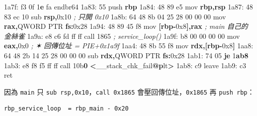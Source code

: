 \documentclass[10pt,a4paper]{article}
\newenvironment{Shaded}{\begin{snugshade}}{\end{snugshade}}
\newcommand{\BaseNTok}[1]{\textcolor[rgb]{0.00,0.00,0.81}{#1}}
\newcommand{\BuiltInTok}[1]{#1}
\newcommand{\CommentTok}[1]{\textcolor[rgb]{0.56,0.35,0.01}{\textit{#1}}}
\newcommand{\ControlFlowTok}[1]{\textcolor[rgb]{0.13,0.29,0.53}{\textbf{#1}}}
\newcommand{\DataTypeTok}[1]{\textcolor[rgb]{0.13,0.29,0.53}{#1}}
\newcommand{\DecValTok}[1]{\textcolor[rgb]{0.00,0.00,0.81}{#1}}
\newcommand{\ErrorTok}[1]{\textcolor[rgb]{0.64,0.00,0.00}{\textbf{#1}}}
\newcommand{\FloatTok}[1]{\textcolor[rgb]{0.00,0.00,0.81}{#1}}
\newcommand{\FunctionTok}[1]{\textcolor[rgb]{0.13,0.29,0.53}{\textbf{#1}}}
\newcommand{\KeywordTok}[1]{\textcolor[rgb]{0.13,0.29,0.53}{\textbf{#1}}}
\newcommand{\NormalTok}[1]{#1}
\newcommand{\OperatorTok}[1]{\textcolor[rgb]{0.81,0.36,0.00}{\textbf{#1}}}
\renewenvironment{Shaded}{%
  \def\FrameCommand{\fboxsep=3.2pt\colorbox{shadecolor}}%
  \MakeFramed{\advance\hsize-\width\FrameRestore\small}%
}{%
  \endMakeFramed
}
\begin{document}
\begin{Shaded}
\begin{Highlighting}[]
\NormalTok{1a7f: f3 }\FloatTok{0}\BaseNTok{f} \DecValTok{1}\ErrorTok{e}\NormalTok{ fa            endbr64}
\NormalTok{1a83: 55                     }\BuiltInTok{push}   \KeywordTok{rbp}
\NormalTok{1a84: 48 89 e5               mov    }\KeywordTok{rbp}\OperatorTok{,}\KeywordTok{rsp}
\NormalTok{1a87: 48 83 ec }\DecValTok{10}\NormalTok{            sub    }\KeywordTok{rsp}\OperatorTok{,}\BaseNTok{0x10}                 \CommentTok{; 只開 0x10}
\NormalTok{1a8b: 64 48 8b 04 25 28 00 00 00  }\BuiltInTok{mov} \KeywordTok{rax}\OperatorTok{,}\DataTypeTok{QWORD} \DataTypeTok{PTR} \KeywordTok{fs}\OperatorTok{:}\BaseNTok{0x28}
\NormalTok{1a94: 48 89 45 f8            mov    }\OperatorTok{[}\KeywordTok{rbp}\OperatorTok{{-}}\BaseNTok{0x8}\OperatorTok{],}\KeywordTok{rax}           \CommentTok{; main 自己的金絲雀}
\NormalTok{1a9a: e8 c6 fd ff ff         call   }\DecValTok{1865}                     \CommentTok{; service\_loop()}
\NormalTok{1a9f: b8 }\DecValTok{00} \DecValTok{00} \DecValTok{00} \DecValTok{00}\NormalTok{         mov    }\KeywordTok{eax}\OperatorTok{,}\BaseNTok{0x0}                  \CommentTok{; ✶ 回傳位址 = PIE+0x1a9f}
\NormalTok{1aa4: 48 8b 55 f8            mov    }\KeywordTok{rdx}\OperatorTok{,[}\KeywordTok{rbp}\OperatorTok{{-}}\BaseNTok{0x8}\OperatorTok{]}
\NormalTok{1aa8: 64 48 2b 14 25 28 00 00 00  }\BuiltInTok{sub} \KeywordTok{rdx}\OperatorTok{,}\DataTypeTok{QWORD} \DataTypeTok{PTR} \KeywordTok{fs}\OperatorTok{:}\BaseNTok{0x28}
\NormalTok{1ab1: 74 05                  }\ControlFlowTok{je}     \DecValTok{1}\ErrorTok{ab8}
\NormalTok{1ab3: e8 f8 f5 ff ff         call   }\BaseNTok{10b}\ErrorTok{0} \OperatorTok{\textless{}}\NormalTok{\_\_stack\_chk\_fail}\FunctionTok{@}\ErrorTok{p}\NormalTok{lt}\OperatorTok{\textgreater{}}
\NormalTok{1ab8: c9                     leave}
\NormalTok{1ab9: c3                     ret}
\end{Highlighting}
\end{Shaded}

因為 \texttt{main} 只 \texttt{sub\ \allowbreak{}rsp,\allowbreak{}0x10}，\texttt{call\ \allowbreak{}0x1865}
會壓回傳位址，\texttt{0x1865} 再 \texttt{push\ \allowbreak{}rbp}：

\begin{Verbatim}[breaklines=true,breakanywhere=true,breakautoindent=false,fontsize=\fontsize{7.0}{9.5}\selectfont]
rbp_service_loop  = rbp_main - 0x20
\end{Verbatim}
\end{document}
